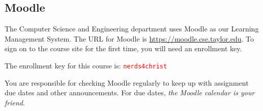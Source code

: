 \subsection{Moodle}

The Computer Science and Engineering department uses Moodle
as our Learning Management System.
The URL for Moodle is \url{https://moodle.cse.taylor.edu}.
To sign on to the course site for the first time,
you will need an enrollment key.
\begin{flushleft}
  \begin{framed}
    The enrollment key for this course is:
    \textcolor{red}{\texttt{nerds4christ}}
  \end{framed}
\end{flushleft}
You are responsible for checking Moodle regularly
to keep up with assignment due dates and other announcements.
For due dates, \emph{the Moodle calendar is your friend}.
